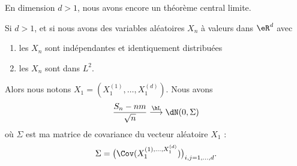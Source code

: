 En dimension \( d>1\), nous avons encore un théorème central limite.
\begin{theorem}
    Si \( d>1\), et si nous avons des variables aléatoires \( X_n\) à valeurs dans \( \eR^d\) avec
    \begin{enumerate}
        \item
            les \( X_n\) sont indépendantes et identiquement distribuées
        \item
            les \( X_n\) sont dans \( L^2\).
    \end{enumerate}
    Alors nous notons \( X_1=(X_1^{(1)},\ldots,X_1^{(d)})\). Nous avons
    \begin{equation}
        \frac{ S_n-nm }{ \sqrt{n} }\stackrel{\hL}{\longrightarrow}\dN(0,\Sigma)
    \end{equation}
    où \( \Sigma\) est ma matrice de covariance du vecteur aléatoire \( X_1\) :
    \begin{equation}
        \Sigma=\big( \Cov(X_1^{(1),\ldots,X_1^{(d)}}) \big)_{i,j=1,\ldots,d}.
    \end{equation}
\end{theorem}
